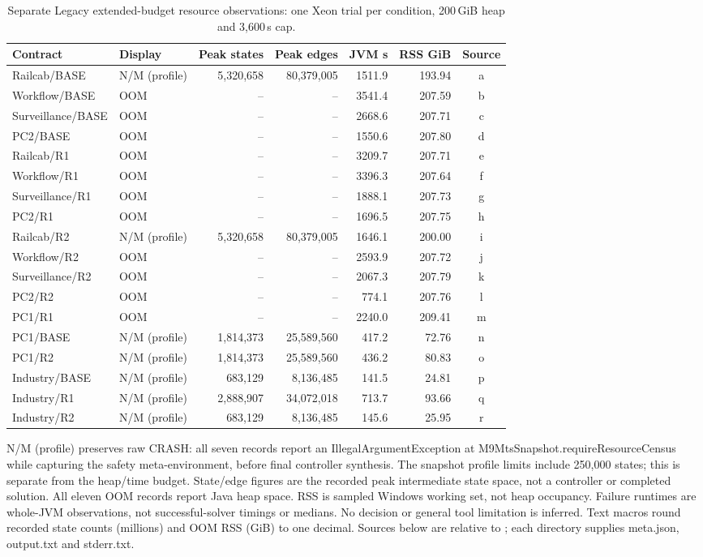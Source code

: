 \begin{table}[!htbp]
\centering\small
\caption{Separate Legacy extended-budget resource observations: one Xeon trial per condition, 200\,GiB heap and 3,600\,s cap.}
\label{tab:vthree-ext-six}
\setlength{\tabcolsep}{3pt}
\begin{tabular}{llrrrrc}
\toprule
Contract & Display & Peak states & Peak edges & JVM s & RSS GiB & Source \\
\midrule
Railcab/BASE & N/M (profile) & 5,320,658 & 80,379,005 & 1511.9 & 193.94 & a \\
Workflow/BASE & OOM & -- & -- & 3541.4 & 207.59 & b \\
Surveillance/BASE & OOM & -- & -- & 2668.6 & 207.71 & c \\
PC2/BASE & OOM & -- & -- & 1550.6 & 207.80 & d \\
Railcab/R1 & OOM & -- & -- & 3209.7 & 207.71 & e \\
Workflow/R1 & OOM & -- & -- & 3396.3 & 207.64 & f \\
Surveillance/R1 & OOM & -- & -- & 1888.1 & 207.73 & g \\
PC2/R1 & OOM & -- & -- & 1696.5 & 207.75 & h \\
Railcab/R2 & N/M (profile) & 5,320,658 & 80,379,005 & 1646.1 & 200.00 & i \\
Workflow/R2 & OOM & -- & -- & 2593.9 & 207.72 & j \\
Surveillance/R2 & OOM & -- & -- & 2067.3 & 207.79 & k \\
PC2/R2 & OOM & -- & -- & 774.1 & 207.76 & l \\
PC1/R1 & OOM & -- & -- & 2240.0 & 209.41 & m \\
PC1/BASE & N/M (profile) & 1,814,373 & 25,589,560 & 417.2 & 72.76 & n \\
PC1/R2 & N/M (profile) & 1,814,373 & 25,589,560 & 436.2 & 80.83 & o \\
Industry/BASE & N/M (profile) & 683,129 & 8,136,485 & 141.5 & 24.81 & p \\
Industry/R1 & N/M (profile) & 2,888,907 & 34,072,018 & 713.7 & 93.66 & q \\
Industry/R2 & N/M (profile) & 683,129 & 8,136,485 & 145.6 & 25.95 & r \\
\bottomrule
\end{tabular}
\par\smallskip\footnotesize N/M (profile) preserves raw CRASH: all seven records report an IllegalArgumentException at M9MtsSnapshot.requireResourceCensus while capturing the safety meta-environment, before final controller synthesis. The snapshot profile limits include 250,000 states; this is separate from the heap/time budget. State/edge figures are the recorded peak intermediate state space, not a controller or completed solution. All eleven OOM records report Java heap space. RSS is sampled Windows working set, not heap occupancy. Failure runtimes are whole-JVM observations, not successful-solver timings or medians. No decision or general tool limitation is inferred. Text macros round recorded state counts (millions) and OOM RSS (GiB) to one decimal. Sources below are relative to ; each directory supplies meta.json, output.txt and stderr.txt.

\end{table}
